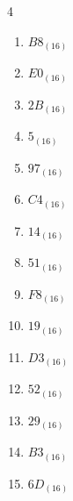 \begin{multicols}{4}
\begin{enumerate}
        \phantom{$=32$}

  \item $B8_{(16)}$

        \phantom{$=184$}

  \item $E0_{(16)}$

        \phantom{$=224$}

  \item $2B_{(16)}$

        \phantom{$=43$}

  \item $5_{(16)}$

        \phantom{$=5$}

  \item $97_{(16)}$

        \phantom{$=151$}

  \item $C4_{(16)}$

        \phantom{$=196$}

  \item $14_{(16)}$

        \phantom{$=20$}

  \item $51_{(16)}$

        \phantom{$=81$}

\columnbreak %

  \item $F8_{(16)}$

        \phantom{$=248$}

  \item $19_{(16)}$

        \phantom{$=25$}

  \item $D3_{(16)}$

        \phantom{$=211$}

  \item $52_{(16)}$

        \phantom{$=82$}

  \item $29_{(16)}$

        \phantom{$=41$}

  \item $B3_{(16)}$

        \phantom{$=179$}

  \item $6D_{(16)}$

        \phantom{$=109$}


\end{enumerate}
\end{multicols}

